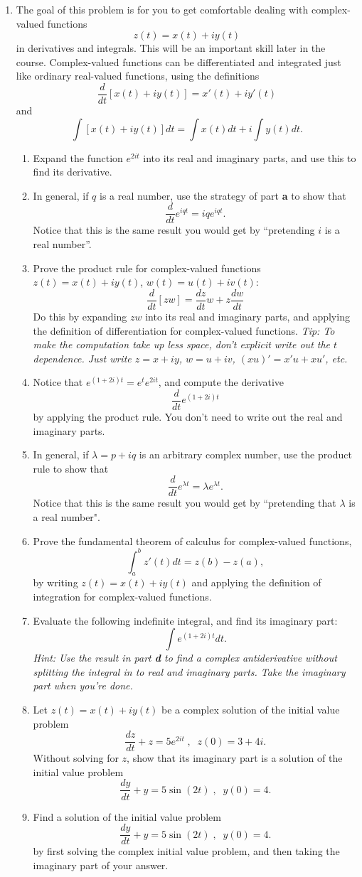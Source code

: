 \documentclass[10pt,psamsfonts,reqno,oneside,letterpaper]{amsart}
\begin{document}
\begin{enumerate}
	\item The goal of this problem is for you to get comfortable dealing with complex-valued functions
	\[ z(t) = x(t) + iy(t) \]
	in derivatives and integrals.   This will be an important skill later in the course.  Complex-valued functions can be differentiated and integrated just like ordinary real-valued functions, using the definitions
	\[ \frac{d}{dt}\left[ x(t) + iy(t)\right] = x'(t) + i y'(t) \]
	and
	\[ \int \left[x(t) + iy(t)\right] dt = \int x(t)dt + i \int y(t) dt .\]
	\begin{enumerate}
		\item  Expand the function $e^{2it}$ into its real and imaginary parts, and use this to find its derivative.
		\item  In general, if $q$ is a real number, use the strategy of part \textbf{a} to show that
		\[ \frac{d}{dt} e^{iqt} = iqe^{iqt}. \] 
		Notice that this is the same result you would get by ``pretending $i$ is a real number''. 
		\item  Prove the product rule for complex-valued functions $z(t) = x(t)+iy(t)$, $w(t) = u(t)+iv(t)$:
		\[ \frac{d}{dt} \left [ z w \right] = \frac{dz}{dt} w  + z \frac{d w}{dt} \]
		Do this by expanding $zw$ into its real and imaginary parts, and applying the definition of differentiation for complex-valued functions.
		\textit{Tip: To make the computation take up less space, don't explicit write out the $t$ dependence.  Just write $z = x+iy$, $w = u+iv$, $(xu)' = x'u + xu'$, etc.}
		\item  Notice that $e^{(1+2i)t} = e^t e^{2it}$, and compute the derivative
		\[ \frac{d}{dt} e^{(1+2i)t} \]
		by applying the product rule.  You don't need to write out the real and imaginary parts.
		\item  In general, if $\lambda= p+iq$ is an arbitrary complex number, use the product rule to show that
		\[ \frac{d}{dt} e^{\lambda t} = \lambda e^{\lambda t}. \] 
		Notice that this is the same result you would get by ``pretending that $\lambda$ is a real number".
		\item Prove the fundamental theorem of calculus for complex-valued functions,
		\[ \int_a^b z'(t) dt = z(b) - z(a), \]
		by writing $z(t) = x(t) + i y(t)$ and applying the definition of integration for complex-valued functions.  
		\item Evaluate the following indefinite integral, and find its imaginary part: 
		\[ \int e^{(1+2i)t} dt. \]
		\textit{Hint: Use the result in part \textbf{d} to find a complex antiderivative without splitting the integral in to real and imaginary parts.  Take the imaginary part when you're done.}
		\item Let $z(t) = x(t) + iy(t)$ be a complex solution of the initial value problem
		\[ \frac{dz}{dt} + z = 5e^{2it} \; , \; \; z(0) = 3 + 4i. \] 
		Without solving for $z$, show that its imaginary part is a solution of the initial value problem
		\[ \frac{dy}{dt} + y = 5\sin(2t) \; , \; \; y(0) = 4. \]
		\item Find a solution of the initial value problem 
		\[ \frac{dy}{dt} + y = 5\sin(2t) \; , \; \; y(0) = 4. \]
		by first solving the complex initial value problem, and then taking the imaginary part of your answer. 


\end{enumerate}
\end{enumerate}
\end{document}
